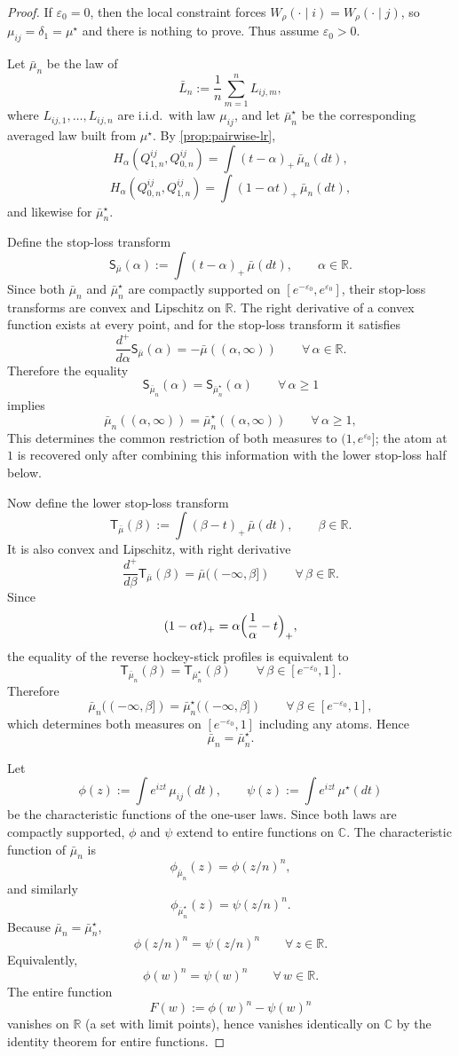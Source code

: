 \documentclass[10pt,a4paper]{amsart}
\newcommand{\R}{\mathbb R}
\begin{document}
\begin{proof}
If $\varepsilon_0=0$, then the local constraint forces $W_\rho(\cdot\mid i)=W_\rho(\cdot\mid j)$, so $\mu_{ij}=\delta_1=\mu^\star$ and there is nothing to prove. Thus assume $\varepsilon_0>0$.

Let $\bar\mu_n$ be the law of
\[
\bar L_n:=\frac1n\sum_{m=1}^n L_{ij,m},
\]
where $L_{ij,1},\dots,L_{ij,n}$ are i.i.d.\ with law $\mu_{ij}$, and let $\bar\mu_n^\star$ be the corresponding averaged law built from $\mu^\star$. By \cref{prop:pairwise-lr},
\[
H_\alpha(Q_{1,n}^{ij},Q_{0,n}^{ij})=\int (t-\alpha)_+\,\bar\mu_n(dt),
\]
\[
H_\alpha(Q_{0,n}^{ij},Q_{1,n}^{ij})=\int (1-\alpha t)_+\,\bar\mu_n(dt),
\]
and likewise for $\bar\mu_n^\star$.

Define the stop-loss transform
\[
\mathsf S_{\bar\mu}(\alpha):=\int (t-\alpha)_+\,\bar\mu(dt),\qquad \alpha\in\R.
\]
Since both $\bar\mu_n$ and $\bar\mu_n^\star$ are compactly supported on $[e^{-\varepsilon_0},e^{\varepsilon_0}]$, their stop-loss transforms are convex and Lipschitz on $\R$. The right derivative of a convex function exists at every point, and for the stop-loss transform it satisfies
\[
\frac{d^+}{d\alpha}\mathsf S_{\bar\mu}(\alpha)=-\bar\mu((\alpha,\infty))
\qquad \forall\,\alpha\in\R.
\]
Therefore the equality
\[
\mathsf S_{\bar\mu_n}(\alpha)=\mathsf S_{\bar\mu_n^\star}(\alpha)\qquad \forall\,\alpha\ge 1
\]
implies
\[
\bar\mu_n((\alpha,\infty))=\bar\mu_n^\star((\alpha,\infty))
\qquad \forall\,\alpha\ge 1,
\]
This determines the common restriction of both measures to $(1,e^{\varepsilon_0}]$; the atom at $1$ is recovered only after combining this information with the lower stop-loss half below.

Now define the lower stop-loss transform
\[
\mathsf T_{\bar\mu}(\beta):=\int (\beta-t)_+\,\bar\mu(dt),\qquad \beta\in\R.
\]
It is also convex and Lipschitz, with right derivative
\[
\frac{d^+}{d\beta}\mathsf T_{\bar\mu}(\beta)=\bar\mu((-\infty,\beta])
\qquad \forall\,\beta\in\R.
\]
Since
\[
(1-\alpha t)_+=\alpha\Bigl(\frac1\alpha-t\Bigr)_+,
\]
the equality of the reverse hockey-stick profiles is equivalent to
\[
\mathsf T_{\bar\mu_n}(\beta)=\mathsf T_{\bar\mu_n^\star}(\beta)
\qquad\forall\,\beta\in[e^{-\varepsilon_0},1].
\]
Therefore
\[
\bar\mu_n((-\infty,\beta])=\bar\mu_n^\star((-\infty,\beta])
\qquad \forall\,\beta\in[e^{-\varepsilon_0},1],
\]
which determines both measures on $[e^{-\varepsilon_0},1]$ including any atoms. Hence
\[
\bar\mu_n=\bar\mu_n^\star.
\]

Let
\[
\phi(z):=\int e^{izt}\,\mu_{ij}(dt),
\qquad
\psi(z):=\int e^{izt}\,\mu^\star(dt)
\]
be the characteristic functions of the one-user laws. Since both laws are compactly supported, $\phi$ and $\psi$ extend to entire functions on $\mathbb C$. The characteristic function of $\bar\mu_n$ is
\[
\phi_{\bar\mu_n}(z)=\phi(z/n)^n,
\]
and similarly
\[
\phi_{\bar\mu_n^\star}(z)=\psi(z/n)^n.
\]
Because $\bar\mu_n=\bar\mu_n^\star$,
\[
\phi(z/n)^n=\psi(z/n)^n\qquad \forall\, z\in\R.
\]
Equivalently,
\[
\phi(w)^n=\psi(w)^n\qquad \forall\,w\in\R.
\]
The entire function
\[
F(w):=\phi(w)^n-\psi(w)^n
\]
vanishes on $\R$ (a set with limit points), hence vanishes identically on $\mathbb C$ by the identity theorem for entire functions.


\end{proof}
\end{document}
